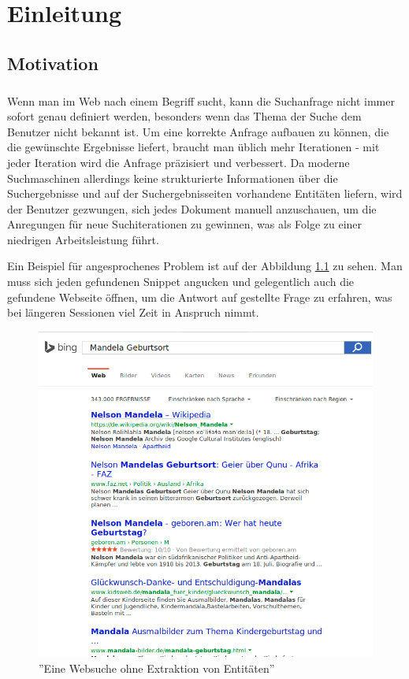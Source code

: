 \chapter{Einleitung}

\section{Motivation}
\label{sec:Motivation}
\paragraph{}
Wenn man im Web nach einem Begriff sucht, kann die Suchanfrage nicht immer sofort genau definiert werden, besonders wenn das Thema der Suche dem Benutzer nicht bekannt ist. Um eine korrekte Anfrage aufbauen zu können, die die gewünschte Ergebnisse liefert, braucht man üblich mehr Iterationen - mit jeder Iteration wird die Anfrage präzisiert und verbessert. Da moderne Suchmaschinen allerdings keine strukturierte Informationen über die Suchergebnisse und auf der Suchergebnisseiten vorhandene Entitäten liefern, wird der Benutzer gezwungen, sich jedes Dokument manuell anzuschauen, um die Anregungen für neue Suchiterationen zu gewinnen, was als Folge zu einer niedrigen Arbeitsleistung führt.

Ein Beispiel für angesprochenes Problem ist auf der Abbildung \ref{fig:bing-issue} zu sehen. Man muss sich jeden gefundenen Snippet angucken und gelegentlich auch die gefundene Webseite öffnen, um die Antwort auf gestellte Frage zu erfahren, was bei längeren Sessionen viel Zeit in Anspruch nimmt.

\begin{figure}
\centering
\includegraphics[width=1\textwidth]{Bilder/bing-search.png}
\caption{''Eine Websuche ohne Extraktion von Entitäten''}
\label{fig:bing-issue}
\end{figure}


